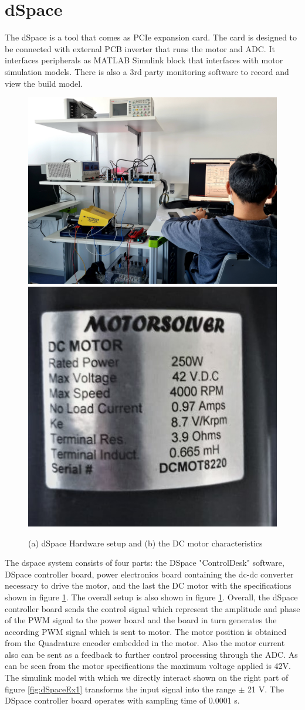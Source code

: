 \documentclass[]{final_report}
\begin{document}
\section{dSpace}

The dSpace is a tool that comes as PCIe expansion card. The card is designed to be connected with external PCB inverter that runs the motor and ADC. It interfaces peripherals as MATLAB Simulink block that interfaces with motor simulation models. There is also a 3rd party monitoring software to record and view the build model. 
\begin{figure} [h!]
\centerline{\includegraphics[width=.52\textwidth]{Screenshots for paper/dSpace/dSpace Hardware.jpg}
\includegraphics[width=.41\textwidth]{Screenshots for paper/dSpace/motor_specs.jpg}}
\caption{(a) dSpace Hardware setup and (b) the DC motor characteristics}
\label{fig:dSpaceHardware setup}
\end{figure}

The dspace system consists of four parts: the DSpace "ControlDesk" software, DSpace controller board, power electronics board containing the dc-dc converter necessary to drive the motor, and the last the DC motor with the specifications shown in figure \ref{fig:dSpaceHardware setup}. The overall setup is also shown in figure \ref{fig:dSpaceHardware setup}. Overall, the dSpace controller board sends the control signal which represent the amplitude and phase of the PWM signal to the power board and the board in turn generates the according PWM signal which is sent to motor. The motor position is obtained from the Quadrature encoder embedded in the motor. Also the motor current also can be sent as a feedback to further control processing through the ADC. As can be seen from the motor specifications the maximum voltage applied is 42V. The simulink model with which we directly interact shown on the right part of figure \ref{fig:dSpaceEx1} transforms the input signal into the range $\pm$ 21 V. The DSpace controller board operates with sampling time of 0.0001 s.
\end{document}
